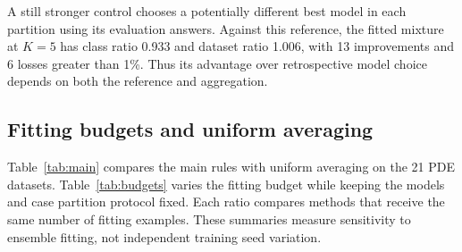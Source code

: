 \begin{table}[h!]
\centering\small
\caption{\textbf{Library quality and mixture gains on the 21 PDE datasets.}
Ratios are geometric means. Wins and losses require a relative difference
greater than 1\%. Best library and best additional baseline refer to the
retrospective per dataset minima described above.}
\label{tab:headlinecomparisons}
\end{table}

A still stronger control chooses a potentially different best model in each
partition using its evaluation answers. Against this reference, the fitted
mixture at $K=5$ has class ratio 0.933 and dataset ratio 1.006, with
13 improvements and 6 losses greater than 1\%. Thus its advantage over
retrospective model choice depends on both the reference and aggregation.

\subsection{Fitting budgets and uniform averaging}
\label{app:budgets}
Table~\ref{tab:main} compares the main rules with uniform averaging on the
21 PDE datasets. Table~\ref{tab:budgets} varies the fitting budget while keeping
the models and case partition protocol fixed. Each ratio compares methods that
receive the same number of fitting examples. These summaries measure sensitivity
to ensemble fitting, not independent training seed variation.

\begin{table}[h!]
\centering\small
\caption{\textbf{Weighting the same nine model library.} Ratios compare with
the Selected model at $K=5$ on 21 PDE datasets. Lower is better. Wins and losses
require changes larger than 1\%.}
\label{tab:main}
\end{table}

\begin{table}[h!]
\centering\small
\caption{\textbf{Increasing the fitting budget on the 21 PDE datasets.}
Class aggregated error ratios. The models remain fixed, and every comparison
uses the same allowance of $K$ additional fine fields.}
\label{tab:budgets}
\end{table}


